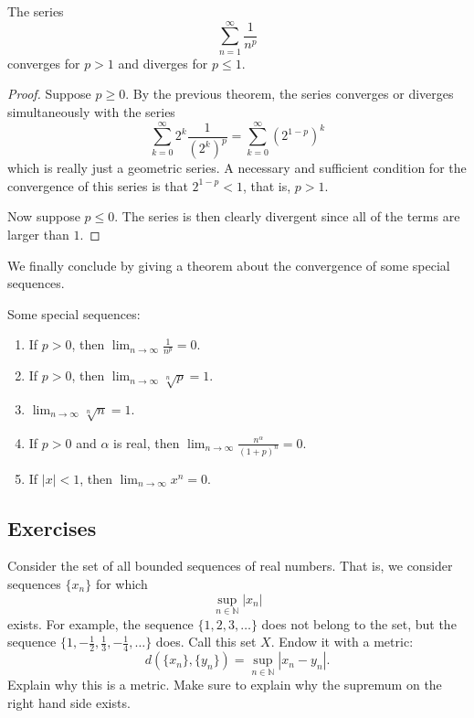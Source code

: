   \begin{corollary}
  The series 
  \[\sum_{n=1}^\infty \frac{1}{n^p}\]
  converges for $p>1$ and diverges for $p \leq 1$. 
  \end{corollary}
  \begin{proof}
  Suppose $p\geq 0$. By the previous theorem, the series converges or diverges simultaneously with the series 
  \[\sum_{k=0}^\infty 2^k \frac{1}{(2^k)^p} = \sum_{k=0}^\infty (2^{1-p})^k\]
  which is really just a geometric series. A necessary and sufficient condition for the convergence of this series is that $2^{1-p} < 1$, that is, $p>1$. 

  Now suppose $p \leq 0$. The series is then clearly divergent since all of the terms are larger than $1$. 
  \end{proof}

  We finally conclude by giving a theorem about the convergence of some special sequences. 

  \begin{theorem}
    Some special sequences: 
    \begin{enumerate}
      \item If $p > 0$, then $\lim_{n \rightarrow \infty} \frac{1}{n^p} = 0$. 
      
      \item If $p > 0$, then $\lim_{n \rightarrow \infty} \sqrt[n]{p} = 1$. 

      \item $\lim_{n \rightarrow \infty} \sqrt[n]{n} = 1$. 

      \item If $p > 0$ and $\alpha$ is real, then $\lim_{n \rightarrow \infty} \frac{n^\alpha}{(1 + p)^n} = 0$. 
      
      \item If $|x| < 1$, then $\lim_{n \rightarrow \infty} x^n = 0$. 
    \end{enumerate}
  \end{theorem}

\subsection{Exercises}

  \begin{exercise}
    Consider the set of all bounded sequences of real numbers. That is, we
    consider sequences $\{x_n\}$ for which
    \begin{equation}
      \sup_{n\in\mathbb{N}} |x_n|
    \end{equation}
    exists. For example, the sequence $\{1,2,3,\ldots\}$ does not belong to the set,
    but the sequence $\{1,-\frac{1}{2},\frac{1}{3},-\frac{1}{4},\ldots\}$ does. Call this set $X$. Endow it with
    a metric:
    \begin{equation}
      d(\{x_n\},\{y_n\}) = \sup_{n\in\mathbb{N}} |x_n - y_n|.
    \end{equation}
    Explain why this is a metric. Make sure to explain why the supremum on
    the right hand side exists.
  \end{exercise}

